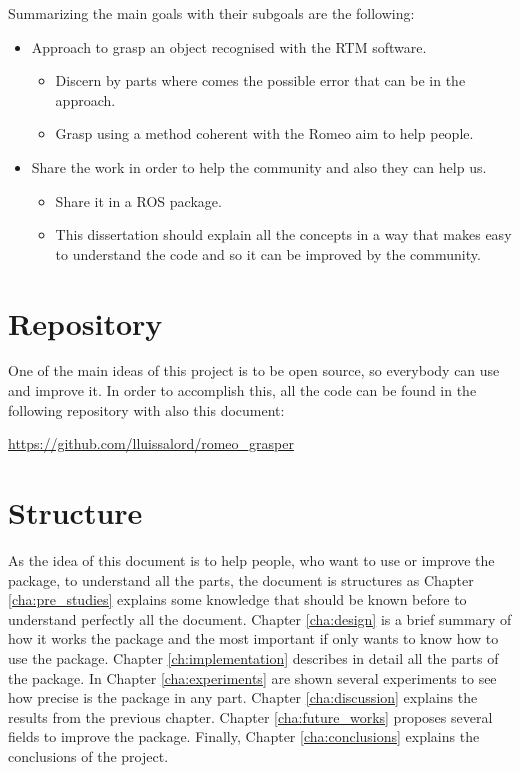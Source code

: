 \documentclass[12pt,a4paper,final,twoside,openright]{report}
\begin{document}
Summarizing the main goals with their subgoals are the following:
\begin{itemize}
\item Approach to grasp an object recognised with the RTM software.
\begin{itemize}
\item Discern by parts where comes the possible error that can be in the approach.
\item Grasp using a method coherent with the Romeo aim to help people.
\end{itemize}
\item Share the work in order to help the community and also they can help us.
\begin{itemize}
\item Share it in a ROS package.
\item This dissertation should explain all the concepts in a way that makes easy to understand the code and so it can be improved by the community.
\end{itemize}
\end{itemize}

\vspace{-10pt}
\section{Repository}
\label{sec:repository}

\vspace{-5pt}
One of the main ideas of this project is to be open source, so everybody can use and improve it. In order to accomplish this, all the code can be found in the following repository with also this document:

\url{https://github.com/lluissalord/romeo_grasper}

\vspace{-10pt}
\section{Structure}

\vspace{-5pt}
As the idea of this document is to help people, who want to use or improve the package, to understand all the parts, the document is structures as Chapter \ref{cha:pre_studies} explains some knowledge that should be known before to understand perfectly all the document. Chapter \ref{cha:design} is a brief summary of how it works the package and the most important if only wants to know how to use the package. Chapter \ref{ch:implementation} describes in detail all the parts of the package. In Chapter \ref{cha:experiments} are shown several experiments to see how precise is the package in any part. Chapter \ref{cha:discussion} explains the results from the previous chapter. Chapter \ref{cha:future_works} proposes several fields to improve the package. Finally, Chapter \ref{cha:conclusions} explains the conclusions of the project.
\end{document}
